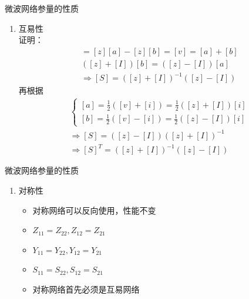 \begin{frame}{微波网络参量的性质}
    \begin{enumerate}
        \item 互易性 \\
              证明：
              \begin{align*}
                  [z][i]=[z][a]-[z][b]=[v]=[a]+[b] \\
                  ([z]+[I])[b]=([z]-[I])[a]        \\
                  \Rightarrow[S]=([z]+[I])^{-1}([z]-[I])
              \end{align*}
              再根据
              \begin{align*}
                  \begin{cases}
                      [a]=\frac{1}{2}([v]+[i])=\frac{1}{2}([z]+[I])[i] \\
                      [b]=\frac{1}{2}([v]-[i])=\frac{1}{2}([z]-[I])[i]
                  \end{cases} \\
                  \Rightarrow [S]=([z]-[I])([z]+[I])^{-1}          \\
                  \Rightarrow [S]^T=([z]+[I])^{-1}([z]-[I])
              \end{align*}
    \end{enumerate}
\end{frame}

\begin{frame}{微波网络参量的性质}
    \begin{enumerate}
        \resume
        \item 对称性
              \begin{itemize}
                  \item 对称网络可以反向使用，性能不变
                  \item $Z_{11}=Z_{22},Z_{12}=Z_{21}$
                  \item $Y_{11}=Y_{22},Y_{12}=Y_{21}$
                  \item $S_{11}=S_{22},S_{12}=S_{21}$
                  \item 对称网络首先必须是互易网络
              \end{itemize}
              \saveenum
    \end{enumerate}
\end{frame}

